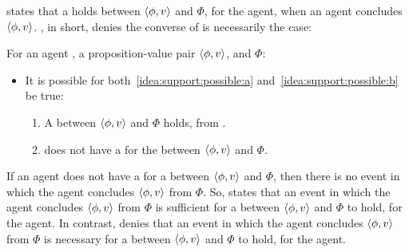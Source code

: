 \begin{note}
  \supportI{} states that a \ros{} holds between \(\langle \phi, v \rangle\) and \(\Phi\), for the agent, when an agent concludes \(\langle \phi, v \rangle\).
  \supportII{}, in short, denies the converse of \supportI{} is necessarily the case:

  \begin{idea}[\supportII{}]
    \label{idea:support:possible}
    For an agent \vAgent{}, a proposition-value pair \(\langle \phi, v \rangle\), and \poP{} \(\Phi\):

    \begin{itemize}
    \item
      It is possible for both~\ref{idea:support:possible:a} and~\ref{idea:support:possible:b} be true:
      \begin{enumerate}[label=\alph*., ref=(\alph*)]
      \item
        \label{idea:support:possible:a}
        A \ros{} between \(\langle \phi, v \rangle\) and \(\Phi\) holds, from .
      \item
        \label{idea:support:possible:b}
        \vAgent{} does not have a \wit{} for the \ros{} between \(\langle \phi, v \rangle\) and \(\Phi\).
      \end{enumerate}
    \end{itemize}
    \vspace{-\baselineskip}
  \end{idea}

  If an agent does not have a \wit{} for a \ros{} between \(\langle \phi, v \rangle\) and \(\Phi\), then there is no event in which the agent concludes \(\langle \phi, v \rangle\) from \(\Phi\).
  So, \supportI{} states that an event in which the agent concludes \(\langle \phi, v \rangle\) from \(\Phi\) is sufficient for a \ros{} between \(\langle \phi, v \rangle\) and \(\Phi\) to hold, for the agent.
  In contrast, \supportII{} denies that an event in which the agent concludes \(\langle \phi, v \rangle\) from \(\Phi\) is necessary for a \ros{} between \(\langle \phi, v \rangle\) and \(\Phi\) to hold, for the agent.
\end{note}

